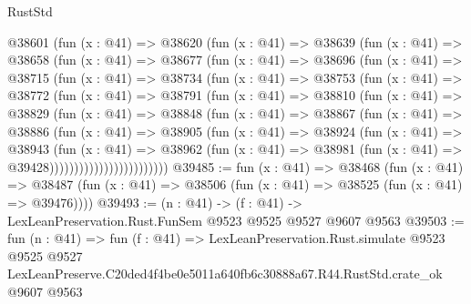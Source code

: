 \begin{lexlean}{RustStd}
\begin{coremodule}
        @38601
          (fun (x : @41) =>
          @38620
            (fun (x : @41) =>
            @38639
              (fun (x : @41) =>
              @38658
                (fun (x : @41) =>
                @38677
                  (fun (x : @41) =>
                  @38696
                    (fun (x : @41) =>
                    @38715
                      (fun (x : @41) =>
                      @38734
                        (fun (x : @41) =>
                        @38753
                          (fun (x : @41) =>
                          @38772
                            (fun (x : @41) =>
                            @38791
                              (fun (x : @41) =>
                              @38810
                                (fun (x : @41) =>
                                @38829
                                  (fun (x : @41) =>
                                  @38848
                                    (fun (x : @41) =>
                                    @38867
                                      (fun (x : @41) =>
                                      @38886
                                        (fun (x : @41) =>
                                        @38905
                                          (fun (x : @41) =>
                                          @38924
                                            (fun (x : @41) =>
                                            @38943
                                              (fun (x : @41) =>
                                              @38962
                                                (fun (x : @41) =>
                                                @38981
                                                  (fun (x : @41) => @39428))))))))))))))))))))))))
@39485 := fun (x : @41) =>
  @38468
    (fun (x : @41) =>
    @38487 (fun (x : @41) => @38506 (fun (x : @41) => @38525 (fun (x : @41) => @39476))))
@39493 := (n : @41) -> (f : @41) -> LexLeanPreservation.Rust.FunSem @9523 @9525 @9527 @9607 @9563
@39503 := fun (n : @41) =>
  fun (f : @41) =>
  LexLeanPreservation.Rust.simulate
    @9523
    @9525
    @9527
    LexLeanPreserve.C20ded4f4be0e5011a640fb6c30888a67.R44.RustStd.crate_ok
    @9607
    @9563
\end{coremodule}
\end{lexlean}

